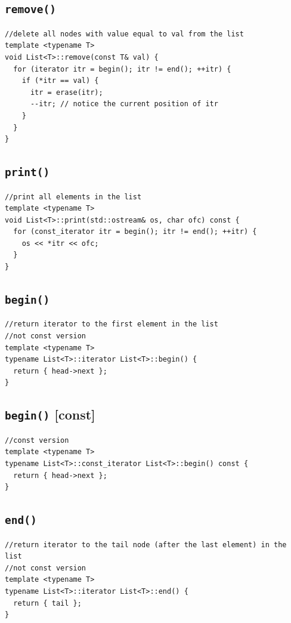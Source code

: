 \documentclass[12pt]{book}
\begin{document}
\subsection{\texttt{remove()}}
\label{sec:orge00c523}
\begin{verbatim}
//delete all nodes with value equal to val from the list
template <typename T>
void List<T>::remove(const T& val) {
  for (iterator itr = begin(); itr != end(); ++itr) {
    if (*itr == val) {
      itr = erase(itr);
      --itr; // notice the current position of itr 
    }
  }
}
\end{verbatim}
\subsection{\texttt{print()}}
\label{sec:orgb7ea0f9}
\begin{verbatim}
//print all elements in the list
template <typename T>
void List<T>::print(std::ostream& os, char ofc) const {
  for (const_iterator itr = begin(); itr != end(); ++itr) {
    os << *itr << ofc;
  }
}
\end{verbatim}
\subsection{\texttt{begin()}}
\label{sec:orgc52ce4c}
\begin{verbatim}
//return iterator to the first element in the list
//not const version
template <typename T>
typename List<T>::iterator List<T>::begin() {
  return { head->next };
}
\end{verbatim}
\subsection{\texttt{begin()} [const]}
\label{sec:orgc66d587}
\begin{verbatim}
//const version 
template <typename T>
typename List<T>::const_iterator List<T>::begin() const {
  return { head->next };
}
\end{verbatim}
\subsection{\texttt{end()}}
\label{sec:orgd4962b9}
\begin{verbatim}
//return iterator to the tail node (after the last element) in the list 
//not const version 
template <typename T>
typename List<T>::iterator List<T>::end() {
  return { tail };
}
\end{verbatim}
\end{document}
